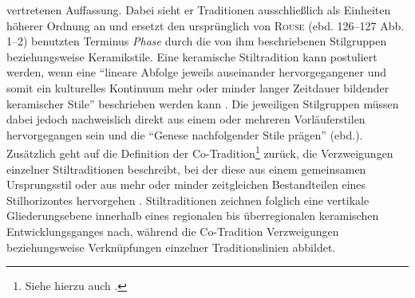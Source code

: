 \textcite{Rouse.1957} vertretenen Auffassung. Dabei sieht er Traditionen ausschließlich als Einheiten höherer Ordnung an und ersetzt den ursprünglich von \textsc{Rouse} (ebd. 126--127 Abb. 1--2) benutzten Terminus \textit{Phase} durch die von ihm beschriebenen Stilgruppen beziehungsweise Keramikstile. Eine keramische Stiltradition kann postuliert werden, wenn eine \enquote{lineare Abfolge jeweils auseinander hervorgegangener und somit ein kulturelles Kontinuum mehr oder minder langer Zeitdauer  bildender keramischer Stile} beschrieben werden kann \parencite[218]{Wotzka.1995}. Die jeweiligen Stilgruppen müssen dabei jedoch nachweislich direkt aus einem oder mehreren Vorläuferstilen hervorgegangen sein und die \enquote{Genese nachfolgender Stile prägen} (ebd.). Zusätzlich geht auf \textcite{Rouse.1957} die Definition der Co-Tradition\footnote{Siehe hierzu auch \textcites[17--18]{Huffman.1970}{Huffman.2005}{Schmidt.1975}{Vogel.1978}{Hall.1983}.} zurück, die Verzweigungen einzelner Stiltraditionen beschreibt, bei der diese aus einem gemeinsamen Ursprungsstil oder aus mehr oder minder zeitgleichen Bestandteilen eines Stilhorizontes hervorgehen \parencite[218; siehe unten]{Wotzka.1995}. Stiltraditionen zeichnen folglich eine vertikale Gliederungsebene innerhalb eines regionalen bis überregionalen keramischen Entwicklungsganges nach, während die Co-Tradition  Verzweigungen beziehungsweise Verknüpfungen einzelner Traditionslinien abbildet.


